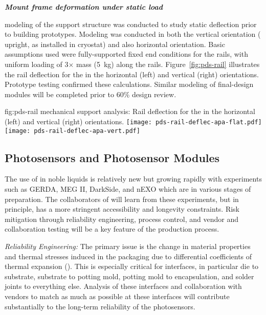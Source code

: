 \textit{\bf {} Mount frame deformation under static  load}


 modeling of the  support structure was conducted to study static deflection prior to building  prototypes.  Modeling was conducted in both the vertical orientation ( upright, as installed in cryostat) and also horizontal orientation.  
Basic assumptions used were fully-supported fixed end conditions for the rails, 
with uniform loading of 3$\times$  mass (\SI{5}{kg}) along the rails.  
Figure~\ref{fig:pds-rail} illustrates the rail deflection for the  in the horizontal (left) and vertical (right) orientations.
Prototype testing confirmed these calculations.  Similar modeling of final-design   modules will be completed prior to 60\% design review.


\begin{dunefigure}{fig:pds-rail}
{ mechanical support analysis: Rail deflection for the  in the horizontal (left) and vertical (right) orientations.}
	\texttt{[image: pds-rail-deflec-apa-flat.pdf]} 
	\texttt{[image: pds-rail-deflec-apa-vert.pdf]}\\
\end{dunefigure}


\subsection{Photosensors and Photosensor Modules}
\label{sec:fdsp-pd-assy-psm}

The use of  in noble liquids is relatively new but growing rapidly with experiments such as GERDA, MEG II, DarkSide, and nEXO which are in various stages of preparation. The collaborators of  will learn from these experiments, but in principle,  has a more stringent accessibility and longevity constraints. Risk mitigation through reliability engineering, process control, and vendor and collaboration testing will be a key feature of the   production process.

{\textit{Reliability Engineering:}} The primary issue is the change in material properties and thermal stresses induced in the packaging due to differential coefficients of thermal expansion (). This is especially critical for interfaces, in particular
die to substrate, substrate to potting mold, potting mold to encapsulation, and solder joints to everything else. Analysis of these interfaces and collaboration with vendors to match  as much as possible at these interfaces will contribute substantially to the long-term reliability of the photosensors.

